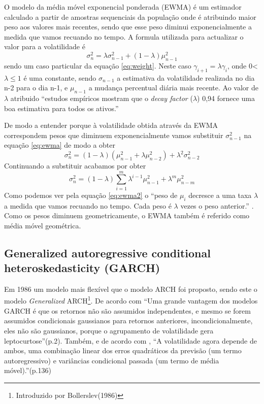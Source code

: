 \documentclass[
  12pt,
  a4paper,
  openany]{book}
\begin{document}
O modelo da média móvel exponencial ponderada (EWMA) é um estimador calculado a partir de amostras sequenciais da população onde é atribuindo maior peso aos valores mais recentes, sendo que esse peso diminui exponencialmente a medida que vamos recuando no tempo. A formula utilizada para actualizar o valor para a volatilidade é
\begin{equation} 
  \sigma_{n}^{2} = \lambda\sigma_{n-1}^{2}+(1-\lambda)\mu_{n-1}^{2} 
  \label{eq:ewma}
\end{equation}
sendo um caso particular da equação \eqref{eq:weight}. Neste caso \(\gamma_{i+1} = \lambda\gamma_{i}\), onde 0\textless{}\(\lambda\leq1\) é uma constante, sendo \(\sigma_{n-1}\) a estimativa da volatilidade realizada no dia n-2 para o dia n-1, e \(\mu_{n-1}\) a mudança percentual diária mais recente. Ao valor de \(\lambda\) atribuido ``estudos empíricos mostram que o \emph{decay factor} (\(\lambda\)) 0,94 fornece uma boa estimativa para todos os ativos.''\citep[p.4]{riskmetrics}

De modo a entender porque à volatilidade obtida através da EWMA correspondem pesos que diminuem exponencialmente vamos substituir \(\sigma_{n-1}^{2}\) na equação \eqref{eq:ewma} de modo a obter
\begin{equation} 
  \sigma_{n}^{2} = (1-\lambda)(\mu_{n-1}^{2}+\lambda\mu_{n-2}^{2})+\lambda^{2}\sigma_{n-2}^{2}
  \label{eq:ewma1}
\end{equation}
Continuando a substituir acabamos por obter
\begin{equation} 
  \sigma_{n}^{2} = (1-\lambda)\sum_{i=1}^{m}\lambda^{i-1}\mu_{n-1}^{2}+\lambda^{m}\mu_{n-m}^{2}
  \label{eq:ewma2}
\end{equation}
Como podemos ver pela equação \eqref{eq:ewma2} o ``peso de \(\mu_{i}\) decresce a uma taxa \(\lambda\) a medida que vamos recuando no tempo. Cada peso é \(\lambda\) vezes o peso anterior.'' \citep[p.226]{HullRisk2018}. Como os pesos diminuem geometricamente, o EWMA também é referido como média móvel geométrica.

\hypertarget{generalized-autoregressive-conditional-heteroskedasticity-garch}{%
\subsection{Generalized autoregressive conditional heteroskedasticity (GARCH)}\label{generalized-autoregressive-conditional-heteroskedasticity-garch}}

Em 1986 um modelo mais flexível que o modelo ARCH foi proposto, sendo este o modelo \emph{Generalized} ARCH\footnote{Introduzido por Bollerslev(1986)}. De acordo com \citet{volatilitymodels} ``Uma grande vantagem dos modelos GARCH é que os retornos não são assumidos independentes, e mesmo se forem assumidos condicionais gaussianos para retornos anteriores, incondicionalmente, eles não são gaussianos, porque o agrupamento de volatilidade gera leptocurtose''(p.2). Também, e de acordo com \citet{portanalyse}, ``A volatilidade agora depende de ambos, uma combinação linear dos erros quadráticos da previsão (um termo autoregressivo) e variâncias condicional passada (um termo de média móvel).''(p.136)
\end{document}
